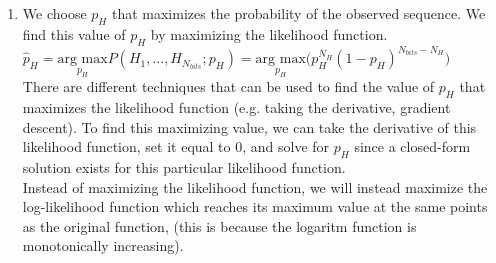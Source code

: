 \documentclass{article}
\begin{document}
\begin{enumerate}
\begin{enumerate}
\begin{enumerate}
			\item
			$\text{[000]: }\int\limits_0^1p_H^0(1-p_H)^3dp_H=\int\limits_0^1(1-p_H)^3dp_H=\left.(-1)\frac{1}{4}(1-p_H)^4\right|_0^1=\frac{-1}{4}\big((1-1)^4-(1-0)^4\big)=\frac{1}{4}$\\
			$\text{[111]: }\int\limits_0^1p_H^3(1-p_H)^0dp_H=\int\limits_0^1p_H^3dp_H=\left.\frac{1}{4}p_H^4\right|_0^1=\frac{1}{4}(1^4-0^4)=\frac{1}{4}$\\
			$\text{[110]: }\int\limits_0^1p_H^2(1-p_H)^1dp_H=\int\limits_0^1(p_H^2-p_H^3)dp_H=\left.(\frac{1}{3}p_H^3-\frac{1}{4}p_H^4)\right|_0^1=\frac{1}{3}-\frac{1}{4}=\frac{1}{12}$\\
			$\text{[001]: }\int\limits_0^1p_H^1(1-p_H)^2dp_H=\int\limits_0^1p_H(1-p_H^2)dp_H=\int\limits_0^1p_H(1-2p_H+p_H^2)dp_H\\=\int\limits_0^1(p_H-2p_H^2+p_H^3)dp_H=\left.(\frac{1}{2}p_H^2-\frac{2}{3}p_H^3+\frac{1}{4}p_H^4)\right|_0^1=\frac{1}{2}-\frac{2}{3}+\frac{1}{4}=\frac{1}{12}$\vspace{0.5em}\\
			You can tell that this is not a valid probability distribution over $p_H$ because the total sum of the area under these curves is not equal to 1. The reason that it's invalid is because these 4 sequences are only a subset of the total possible sequences, (for example, we are missing [101], [100], etc.). 
		\end{enumerate}
		\item We choose $p_H$ that maximizes the probability of the observed sequence. We find this value of $p_H$ by maximizing the likelihood function.
		\vspace{0.5em}\\
		$\hat{p}_H=\underset{p_H}{\mathrm{\text{arg max}}}P(H_1,\text{...},H_{N_{bits}};p_H)=\underset{p_H}{\mathrm{\text{arg max}}}\big(p_H^{N_H}(1-p_H)^{N_{bits}-N_H}\big)$
		\vspace{0.5em}\\
		There are different techniques that can be used to find the value of $p_H$ that maximizes the likelihood function (e.g. taking the derivative, gradient descent). To find this maximizing value, we can take the derivative of this likelihood function, set it equal to 0, and solve for $p_H$ since a closed-form solution exists for this particular likelihood function.
		\vspace{0.5em}\\
		Instead of maximizing the likelihood function, we will instead maximize the log-likelihood function which reaches its maximum value at the same points as the original function, (this is because the logaritm function is monotonically increasing).

\end{enumerate}
\end{enumerate}
\end{document}
